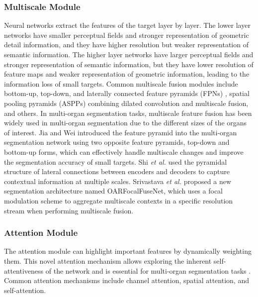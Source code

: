 \documentclass[lettersize,journal]{IEEEtran}
\begin{document}
\subsubsection{Multiscale Module}
Neural networks extract the features of the target layer by layer. The lower layer networks have smaller perceptual fields and stronger representation of geometric detail information, and they have higher resolution but weaker representation of semantic information. The higher layer networks have larger perceptual fields and stronger representation of semantic information, but they have lower resolution of feature maps and weaker representation of geometric information, leading to the information loss of small targets. Common multiscale fusion modules include bottom-up, top-down, and laterally connected feature pyramids (FPNs) \cite{166}, spatial pooling pyramids (ASPPs) \cite{167} combining dilated convolution and multiscale fusion, and others. In multi-organ segmentation tasks, multiscale feature fusion has been widely used in multi-organ segmentation due to the different sizes of the organs of interest. Jia and Wei \cite{69} introduced the feature pyramid into the multi-organ segmentation network using two opposite feature pyramids, top-down and bottom-up forms, which can effectively handle multiscale changes and improve the segmentation accuracy of small targets. Shi {\it{et al.}} \cite{89} used the pyramidal structure of lateral connections between encoders and decoders to capture contextual information at multiple scales. Srivastava {\it{et al.}} \cite{49} proposed a new segmentation architecture named OARFocalFuseNet, which uses a focal modulation scheme to aggregate multiscale contexts in a specific resolution stream when performing multiscale fusion.

\subsubsection{Attention Module}
The attention module can highlight important features by dynamically weighting them. This novel attention mechanism allows exploring the inherent self-attentiveness of the network and is essential for multi-organ segmentation tasks \cite{62,168}. Common attention mechanisms include channel attention, spatial attention, and self-attention.
\end{document}
